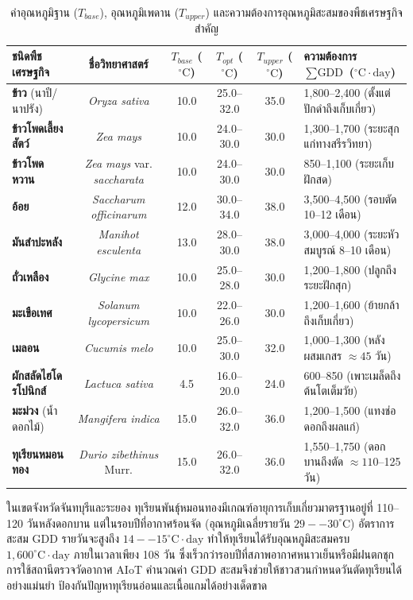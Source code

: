 \begin{table}[H]
\centering
\caption{ค่าอุณหภูมิฐาน ($T_{base}$), อุณหภูมิเพดาน ($T_{upper}$) และความต้องการอุณหภูมิสะสมของพืชเศรษฐกิจสำคัญ}
\label{tab:crop_gdd_database}
\begin{tabularx}{\textwidth}{lccccY}
    \toprule
    \textbf{ชนิดพืชเศรษฐกิจ} & \textbf{ชื่อวิทยาศาสตร์} & \textbf{$T_{base}$ ($^\circ\text{C}$)} & \textbf{$T_{opt}$ ($^\circ\text{C}$)} & \textbf{$T_{upper}$ ($^\circ\text{C}$)} & \textbf{ความต้องการ $\sum\text{GDD}$ ($^\circ\text{C}\cdot\text{day}$)} \\
    \midrule
    \textbf{ข้าว} (นาปี/นาปรัง) & \textit{Oryza sativa} & 10.0 & 25.0--32.0 & 35.0 & 1,800--2,400 (ตั้งแต่ปักดำถึงเก็บเกี่ยว) \\
    \textbf{ข้าวโพดเลี้ยงสัตว์} & \textit{Zea mays} & 10.0 & 24.0--30.0 & 30.0 & 1,300--1,700 (ระยะสุกแก่ทางสรีรวิทยา) \\
    \textbf{ข้าวโพดหวาน} & \textit{Zea mays} var. \textit{saccharata} & 10.0 & 24.0--30.0 & 30.0 & 850--1,100 (ระยะเก็บฝักสด) \\
    \textbf{อ้อย} & \textit{Saccharum officinarum} & 12.0 & 30.0--34.0 & 38.0 & 3,500--4,500 (รอบตัด 10--12 เดือน) \\
    \textbf{มันสำปะหลัง} & \textit{Manihot esculenta} & 13.0 & 28.0--30.0 & 38.0 & 3,000--4,000 (ระยะหัวสมบูรณ์ 8--10 เดือน) \\
    \textbf{ถั่วเหลือง} & \textit{Glycine max} & 10.0 & 25.0--28.0 & 30.0 & 1,200--1,800 (ปลูกถึงระยะฝักสุก) \\
    \textbf{มะเขือเทศ} & \textit{Solanum lycopersicum} & 10.0 & 22.0--26.0 & 30.0 & 1,200--1,600 (ย้ายกล้าถึงเก็บเกี่ยว) \\
    \textbf{เมลอน} & \textit{Cucumis melo} & 10.0 & 25.0--30.0 & 32.0 & 1,000--1,300 (หลังผสมเกสร $\approx 45$ วัน) \\
    \textbf{ผักสลัดไฮโดรโปนิกส์} & \textit{Lactuca sativa} & 4.5 & 16.0--20.0 & 24.0 & 600--850 (เพาะเมล็ดถึงต้นโตเต็มวัย) \\
    \textbf{มะม่วง} (น้ำดอกไม้) & \textit{Mangifera indica} & 15.0 & 26.0--32.0 & 36.0 & 1,200--1,500 (แทงช่อดอกถึงผลแก่) \\
    \textbf{ทุเรียนหมอนทอง} & \textit{Durio zibethinus} Murr. & 15.0 & 26.0--32.0 & 36.0 & 1,550--1,750 (ดอกบานถึงตัด $\approx 110$--125 วัน) \\
    \bottomrule
\end{tabularx}
\end{table}

\begin{theorybox}
ในเขตจังหวัดจันทบุรีและระยอง ทุเรียนพันธุ์หมอนทองมีเกณฑ์อายุการเก็บเกี่ยวมาตรฐานอยู่ที่ 110--120 วันหลังดอกบาน แต่ในรอบปีที่อากาศร้อนจัด (อุณหภูมิเฉลี่ยรายวัน $29--30^\circ\text{C}$) อัตราการสะสม GDD รายวันจะสูงถึง $14--15^\circ\text{C}\cdot\text{day}$ ทำให้ทุเรียนได้รับอุณหภูมิสะสมครบ $1,600^\circ\text{C}\cdot\text{day}$ ภายในเวลาเพียง 108 วัน ซึ่งเร็วกว่ารอบปีที่สภาพอากาศหนาวเย็นหรือมีฝนตกชุก การใช้สถานีตรวจวัดอากาศ AIoT คำนวณค่า GDD สะสมจึงช่วยให้ชาวสวนกำหนดวันตัดทุเรียนได้อย่างแม่นยำ ป้องกันปัญหาทุเรียนอ่อนและเนื้อแกมได้อย่างเด็ดขาด
\end{theorybox}

